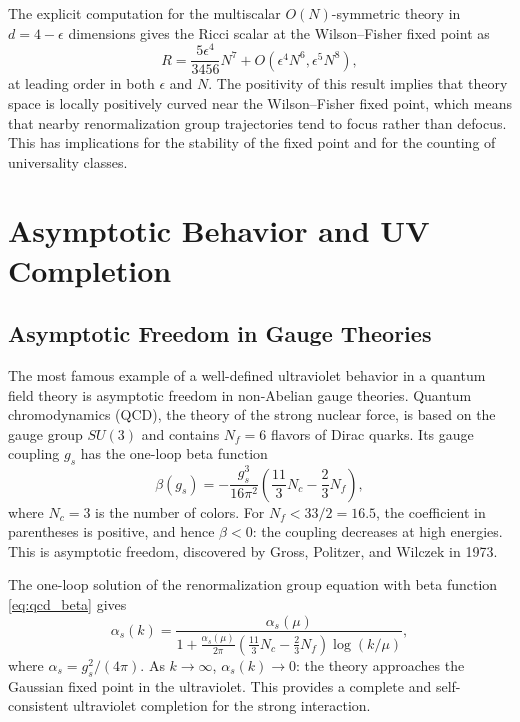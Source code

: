 \documentclass[11pt, twoside, openright]{book}
\theoremstyle{dotted}
\theoremstyle{definition}
\begin{document}
The explicit computation for the multiscalar $O(N)$-symmetric theory in
$d = 4 - \epsilon$ dimensions gives the Ricci scalar at the Wilson--Fisher fixed
point as
\begin{equation}
  R = \frac{5\epsilon^4}{3456}N^7 + O(\epsilon^4 N^6, \epsilon^5 N^8),
  \label{eq:ricci_multiscalar}
\end{equation}
at leading order in both $\epsilon$ and $N$. The positivity of this result implies
that theory space is locally positively curved near the Wilson--Fisher fixed point,
which means that nearby renormalization group trajectories tend to focus rather
than defocus. This has implications for the stability of the fixed point and for
the counting of universality classes.

\chapter{Asymptotic Behavior and UV Completion}
\label{ch:uv_completion}

\section{Asymptotic Freedom in Gauge Theories}

The most famous example of a well-defined ultraviolet behavior in a quantum field
theory is asymptotic freedom in non-Abelian gauge theories. Quantum chromodynamics
(QCD), the theory of the strong nuclear force, is based on the gauge group $SU(3)$
and contains $N_f = 6$ flavors of Dirac quarks. Its gauge coupling $g_s$ has the
one-loop beta function
\begin{equation}
  \beta(g_s) = -\frac{g_s^3}{16\pi^2}
  \left(\frac{11}{3}N_c - \frac{2}{3}N_f\right),
  \label{eq:qcd_beta}
\end{equation}
where $N_c = 3$ is the number of colors. For $N_f < 33/2 = 16.5$, the coefficient
in parentheses is positive, and hence $\beta < 0$: the coupling decreases at high
energies. This is asymptotic freedom, discovered by Gross, Politzer, and Wilczek
in 1973.

The one-loop solution of the renormalization group equation with beta function
\eqref{eq:qcd_beta} gives
\begin{equation}
  \alpha_s(k) = \frac{\alpha_s(\mu)}{1 + \frac{\alpha_s(\mu)}{2\pi}
  \left(\frac{11}{3}N_c - \frac{2}{3}N_f\right)\log(k/\mu)},
  \label{eq:alpha_s_running}
\end{equation}
where $\alpha_s = g_s^2/(4\pi)$. As $k \to \infty$, $\alpha_s(k) \to 0$: the
theory approaches the Gaussian fixed point in the ultraviolet. This provides a
complete and self-consistent ultraviolet completion for the strong interaction.
\end{document}
